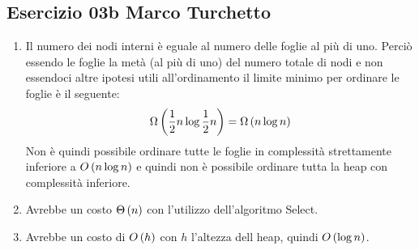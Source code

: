 
\subsection[03b MT]{Esercizio 03b Marco Turchetto}

\begin{enumerate}[label=\alph*)]
\item Il numero dei nodi interni è eguale al numero delle foglie al più di uno.
	Perciò essendo le foglie la metà (al più di uno) del numero totale di nodi 
	e non essendoci altre ipotesi utili all'ordinamento il limite minimo per
	ordinare le foglie è il seguente:
	\begin{equation*}
		\Omega\left(\frac{1}{2}n \log{\frac{1}{2}n} \right) = \Omega\left(n \log n\right)
	\end{equation*}
	Non è quindi possibile ordinare tutte le foglie in complessità strettamente
	inferiore a $O\left(n \log n\right)$ e quindi non è possibile ordinare tutta la heap
	con complessità inferiore.
	
\item Avrebbe un costo $\Theta\left(n\right)$ con l'utilizzo dell'algoritmo Select.

\item Avrebbe un costo di $O\left(h\right)$ con $h$ l'altezza dell heap, quindi $O\left(\log n\right)$.
\end{enumerate}


